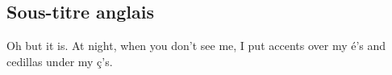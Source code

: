 \documentclass[a4paper]{article}
\begin{document}
\subsection*{Sous-titre anglais}
Oh but it is.  At night, when you don't see me, I put
accents over my é's and cedillas under my ç's.
\begin{comment}
\subsection*{Sous-titre français}
Courez. Venes me devourer.\\

\emph{On voit des mots anglais s'introduire dans les sous-titres français. Les mots
changent pour laisser entendre qu'ils sont en train de vivre une breve aventure
sexuelle suivie par un dénouement, une cigarette et une rupture maladroite.}

\subsection*{Dörty}
\begin{center}
\begin{tabular}{|p{0.3\textwidth}|p{0.3\textwidth}|p{0.3\textwidth}|}\hline
Frizn (parlé) & Français (sous-titres) & Anglais (sous-titres) \\\hline
Sit Sn mak sving? &
Vas y, prends les enfants, je m'en fous, dégage, j'ai commencé une nouvelle vie. &
\\\hline
\end{tabular}
\end{center}\par
\subsection*{Ttö}
\begin{center}
\begin{tabular}{|p{0.3\textwidth}|p{0.3\textwidth}|p{0.3\textwidth}|}\hline
Frizn (parlé) & Français (sous-titres) & Anglais (sous-titres) \\\hline
Ttöfårs bi Sit Sn vatchn... (\emph{geste où sa main montre une pente qui descend
lentement})? &
&
You're a monster, French subtitle.  I'm expecting a check next month or I
will take you to court.\\\hline
\end{tabular}
\end{center}\par

\end{comment}
\end{document}
